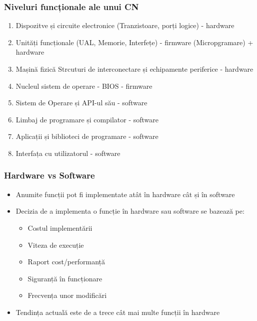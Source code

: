 \begin{frame}
    \frametitle{Niveluri funcționale ale unui CN}
\begin{enumerate}
    \item Dispozitve și circuite electronice (Tranzistoare, porți logice) - hardware
    \item Unități funcționale (UAL, Memorie, Interfețe) - firmware (Micropgramare) + hardware
    \item Mașină fizică Strcuturi de interconectare și echipamente periferice - hardware
    \item Nucleul sistem de operare - BIOS - firmware
    \item Sistem de Operare și API-ul său - software
    \item Limbaj de programare și compilator - software
    \item Aplicații și biblioteci de programare - software
    \item Interfața cu utilizatorul - software
\end{enumerate}

\end{frame}

\begin{frame}
    \frametitle{Hardware vs Software}
\begin{itemize}
    \item Anumite funcții pot fi implementate atât în hardware cât și în software
    \item Decizia de a implementa o funcție în hardware sau software se bazează pe:
    \begin{itemize}
        \item Costul implementării
        \item Viteza de execuție
        \item Raport cost/performanță
        \item Siguranță în funcționare
        \item Frecvența unor modificări
    \end{itemize}
    \item Tendința actuală este de a trece cât mai multe funcții în hardware
\end{itemize}

\end{frame}
